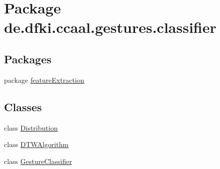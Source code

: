 \hypertarget{namespacede_1_1dfki_1_1ccaal_1_1gestures_1_1classifier}{\section{Package de.\-dfki.\-ccaal.\-gestures.\-classifier}
\label{namespacede_1_1dfki_1_1ccaal_1_1gestures_1_1classifier}
}
\subsection*{Packages}
\begin{DoxyCompactItemize}
\item 
package \hyperlink{namespacede_1_1dfki_1_1ccaal_1_1gestures_1_1classifier_1_1feature_extraction}{feature\-Extraction}
\end{DoxyCompactItemize}
\subsection*{Classes}
\begin{DoxyCompactItemize}
\item 
class \hyperlink{classde_1_1dfki_1_1ccaal_1_1gestures_1_1classifier_1_1_distribution}{Distribution}
\item 
class \hyperlink{classde_1_1dfki_1_1ccaal_1_1gestures_1_1classifier_1_1_d_t_w_algorithm}{D\-T\-W\-Algorithm}
\item 
class \hyperlink{classde_1_1dfki_1_1ccaal_1_1gestures_1_1classifier_1_1_gesture_classifier}{Gesture\-Classifier}
\end{DoxyCompactItemize}
